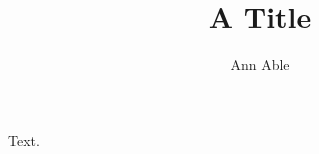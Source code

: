 \documentclass{check_dangling_keywords}
\title{A Title}
\author{Ann Able}
\begin{document}
\maketitle
Text.
\end{document}
